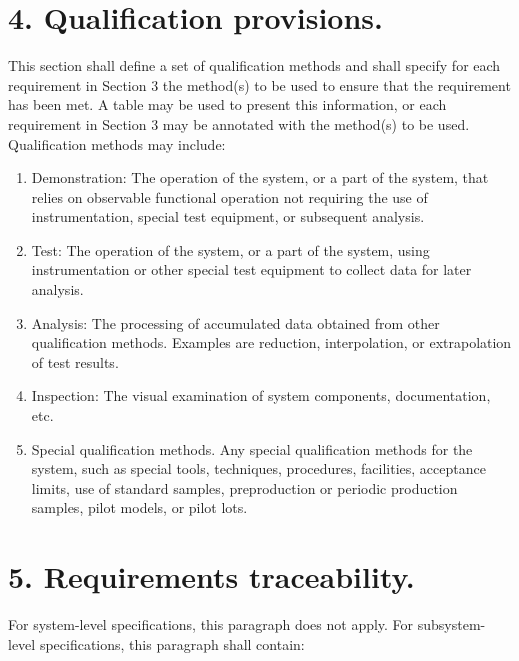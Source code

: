\section{4. Qualification provisions.}

This section shall define a set of qualification methods and shall
specify for each requirement in Section 3 the method(s) to be used to
ensure that the requirement has been met. A table may be used to present
this information, or each requirement in Section 3 may be annotated with
the method(s) to be used. Qualification methods may include:

\begin{enumerate}
\itemsep1pt\parskip0pt
\item
  Demonstration: The operation of the system, or a part of the system,
  that relies on observable functional operation not requiring the use
  of instrumentation, special test equipment, or subsequent analysis.
\item
  Test: The operation of the system, or a part of the system, using
  instrumentation or other special test equipment to collect data for
  later analysis.
\item
  Analysis: The processing of accumulated data obtained from other
  qualification methods. Examples are reduction, interpolation, or
  extrapolation of test results.
\item
  Inspection: The visual examination of system components,
  documentation, etc.
\item
  Special qualification methods. Any special qualification methods for
  the system, such as special tools, techniques, procedures, facilities,
  acceptance limits, use of standard samples, preproduction or periodic
  production samples, pilot models, or pilot lots.
\end{enumerate}

\section{5. Requirements traceability.}

For system-level specifications, this paragraph does not apply. For
subsystem-level specifications, this paragraph shall contain:

